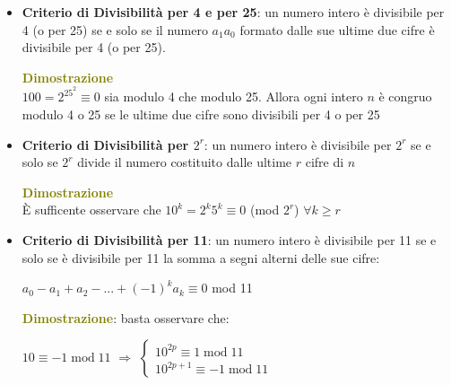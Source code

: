 \begin{flushleft}
\begin{itemize}[nosep]
            \item \textbf{Criterio di Divisibilità per 4 e per 25}: un numero intero è divisibile per 4 (o per 25) se e solo se il numero $a_1a_0$ formato dalle sue ultime due cifre è divisibile per 4 (o per 25).
            \begin{boxA}
                \textcolor{olive}{\textbf{Dimostrazione}} \\
                $100 = 2^25^2 \equiv 0$ sia modulo 4 che modulo 25. Allora ogni intero $n$ è congruo modulo 4 o 25 se le ultime due cifre sono divisibili per 4 o per 25
            \end{boxA}

            \item \textbf{Criterio di Divisibilità per $2^r$}: un numero intero è divisibile per $2^r$ se e solo se $2^r$ divide il numero costituito dalle ultime $r$ cifre di $n$
            \begin{boxA}
                \textcolor{olive}{\textbf{Dimostrazione}} \\
                È sufficente osservare che $10^k = 2^k5^k \equiv 0$ (mod $2^r$) $\forall k \geq r$
            \end{boxA}

            \item \textbf{Criterio di Divisibilità per 11}: un numero intero è divisibile per 11 se e solo se è divisibile per 11 la somma a segni alterni delle sue cifre:
            
            {\centering
                $a_0 - a_1 + a_2 - ... + (-1)^k a_k \equiv 0$ mod 11
            \par}
            \begin{boxA}
                \textcolor{olive}{\textbf{Dimostrazione}}: basta osservare che:

                {\centering
                    $10 \equiv -1 \; \text{mod} \; 11$  $\Rightarrow$   
                    $\begin{cases}
                        10^{2p} \equiv 1 \; \text{mod} \; 11 \\
                        10^{2p + 1} \equiv -1 \; \text{mod} \; 11
                    \end{cases}$
                \par}
            \end{boxA}
            
        \end{itemize}
\end{flushleft}

